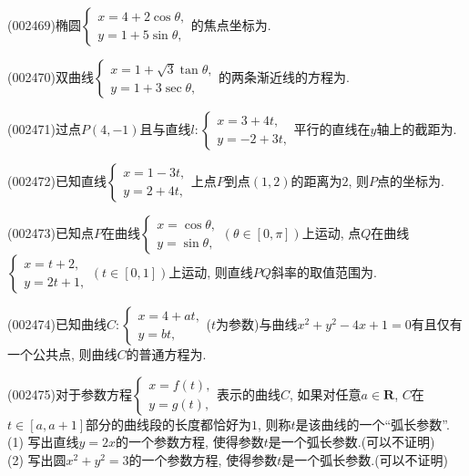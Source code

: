 \item (002469)椭圆$\left\{\begin{array}{l}x=4+2\cos\theta,\\y=1+5\sin\theta,\end{array}\right.$的焦点坐标为.
\item (002470)双曲线$\left\{\begin{array}{l}x=1+\sqrt{3}\tan\theta,\\y=1+3\sec\theta,\end{array}\right.$的两条渐近线的方程为.
\item (002471)过点$P(4,-1)$且与直线$l:\left\{\begin{array}{l}x=3+4t,\\y=-2+3t,\end{array}\right.$平行的直线在$y$轴上的截距为.
\item (002472)已知直线$\left\{\begin{array}{l}x=1-3t,\\y=2+4t,\end{array}\right.$上点$P$到点$(1,2)$的距离为$2$, 则$P$点的坐标为.
\item (002473)已知点$P$在曲线$\left\{\begin{array}{l}x=\cos \theta,\\y=\sin \theta,\end{array}\right.(\theta\in [0,\pi])$上运动, 点$Q$在曲线$\left\{\begin{array}{l}x=t+2,\\y=2t+1,\end{array}\right.(t\in [0,1])$上运动, 则直线$PQ$斜率的取值范围为.
\item (002474)已知曲线$C: \left\{\begin{array}{l}x=4+at,\\y=bt,\end{array}\right.$($t$为参数)与曲线$x^2+y^2-4x+1=0$有且仅有一个公共点, 则曲线$C$的普通方程为.
\item (002475)对于参数方程$\left\{\begin{array}{l}x=f(t),\\y=g(t),\end{array}\right.$表示的曲线$C$, 如果对任意$a\in \mathbf{R}$, $C$在$t\in [a,a+1]$部分的曲线段的长度都恰好为$1$, 则称$t$是该曲线的一个``弧长参数''.\\ 
(1) 写出直线$y=2x$的一个参数方程, 使得参数$t$是一个弧长参数.(可以不证明)\\ 
(2) 写出圆$x^2+y^2=3$的一个参数方程, 使得参数$t$是一个弧长参数.(可以不证明)
